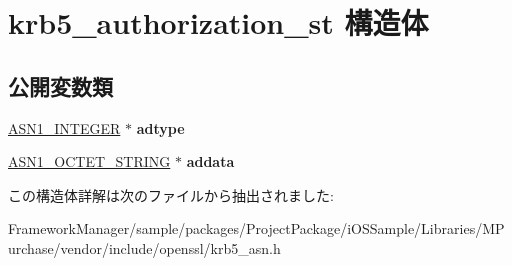 \hypertarget{structkrb5__authorization__st}{}\section{krb5\+\_\+authorization\+\_\+st 構造体}
\label{structkrb5__authorization__st}
\subsection*{公開変数類}
\begin{DoxyCompactItemize}
\item 
\hypertarget{structkrb5__authorization__st_a3e75f4cc0ea59482895df0c540561f82}{}\hyperlink{structasn1__string__st}{A\+S\+N1\+\_\+\+I\+N\+T\+E\+G\+E\+R} $\ast$ {\bfseries adtype}\label{structkrb5__authorization__st_a3e75f4cc0ea59482895df0c540561f82}

\item 
\hypertarget{structkrb5__authorization__st_a26158edad70a1f032c0203033439a5cf}{}\hyperlink{structasn1__string__st}{A\+S\+N1\+\_\+\+O\+C\+T\+E\+T\+\_\+\+S\+T\+R\+I\+N\+G} $\ast$ {\bfseries addata}\label{structkrb5__authorization__st_a26158edad70a1f032c0203033439a5cf}

\end{DoxyCompactItemize}


この構造体詳解は次のファイルから抽出されました\+:\begin{DoxyCompactItemize}
\item 
Framework\+Manager/sample/packages/\+Project\+Package/i\+O\+S\+Sample/\+Libraries/\+M\+Purchase/vendor/include/openssl/krb5\+\_\+asn.\+h\end{DoxyCompactItemize}
